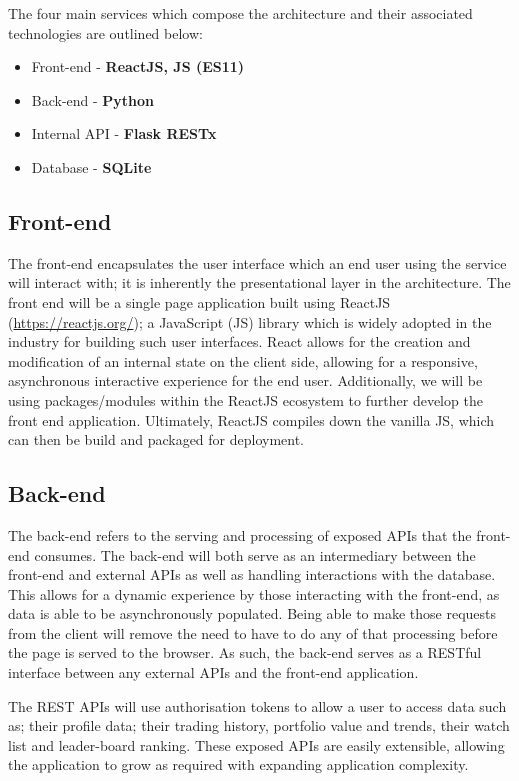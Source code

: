The four main services which compose the architecture and their associated technologies are outlined below:
\begin{itemize}[leftmargin=*,topsep=8pt,itemsep=2pt,partopsep=4pt, parsep=2pt]
\item Front-end - \textbf{ReactJS, JS (ES11)}
\item Back-end - \textbf{Python}
\item Internal API - \textbf{Flask RESTx}
\item Database - \textbf{SQLite}
\end{itemize}

\subsection{Front-end}
 The front-end encapsulates the user interface which an end user using the service will interact with; it is inherently the presentational layer in the architecture. The front end will be a single page application built using ReactJS (\url{https://reactjs.org/}); a JavaScript (JS) library which is widely adopted in the industry for building such user interfaces. React allows for the creation and modification of an internal state on the client side, allowing for a responsive, asynchronous interactive experience for the end user. Additionally, we will be using packages/modules within the ReactJS ecosystem to further develop the front end application. Ultimately, ReactJS compiles down the vanilla JS, which can then be build and packaged for deployment.

\subsection{Back-end}
The back-end refers to the serving and processing of exposed APIs that the front-end consumes. The back-end will both serve as an intermediary between the front-end and external APIs as well as handling interactions with the database. This allows for a dynamic experience by those interacting with the front-end, as data is able to be asynchronously populated. Being able to make those requests from the client will remove the need to have to do any of that processing before the page is served to the browser. As such, the back-end serves as a RESTful interface between any external APIs and the front-end application.

The REST APIs will use authorisation tokens to allow a user to access data such as; their profile data; their trading history, portfolio value and trends, their watch list and leader-board ranking. These exposed APIs are easily extensible, allowing the application to grow as required with expanding application complexity.

